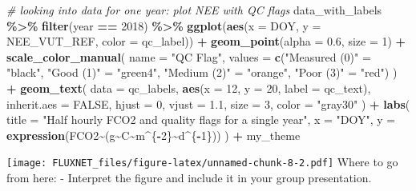 \documentclass[
]{article}
\newenvironment{Shaded}{\begin{snugshade}}{\end{snugshade}}
\newcommand{\AttributeTok}[1]{\textcolor[rgb]{0.13,0.29,0.53}{#1}}
\newcommand{\CommentTok}[1]{\textcolor[rgb]{0.56,0.35,0.01}{\textit{#1}}}
\newcommand{\ConstantTok}[1]{\textcolor[rgb]{0.56,0.35,0.01}{#1}}
\newcommand{\DecValTok}[1]{\textcolor[rgb]{0.00,0.00,0.81}{#1}}
\newcommand{\FloatTok}[1]{\textcolor[rgb]{0.00,0.00,0.81}{#1}}
\newcommand{\FunctionTok}[1]{\textcolor[rgb]{0.13,0.29,0.53}{\textbf{#1}}}
\newcommand{\NormalTok}[1]{#1}
\newcommand{\OtherTok}[1]{\textcolor[rgb]{0.56,0.35,0.01}{#1}}
\newcommand{\SpecialCharTok}[1]{\textcolor[rgb]{0.81,0.36,0.00}{\textbf{#1}}}
\newcommand{\StringTok}[1]{\textcolor[rgb]{0.31,0.60,0.02}{#1}}
\begin{document}
\begin{Shaded}
\begin{Highlighting}[]
\CommentTok{\# looking into data for one year: plot NEE with QC flags}
\NormalTok{data\_with\_labels }\SpecialCharTok{\%\textgreater{}\%}
  \FunctionTok{filter}\NormalTok{(year }\SpecialCharTok{==} \DecValTok{2018}\NormalTok{) }\SpecialCharTok{\%\textgreater{}\%} 
  \FunctionTok{ggplot}\NormalTok{(}\FunctionTok{aes}\NormalTok{(}\AttributeTok{x =}\NormalTok{ DOY, }\AttributeTok{y =}\NormalTok{ NEE\_VUT\_REF, }\AttributeTok{color =}\NormalTok{ qc\_label)) }\SpecialCharTok{+}
  \FunctionTok{geom\_point}\NormalTok{(}\AttributeTok{alpha =} \FloatTok{0.6}\NormalTok{, }\AttributeTok{size =} \DecValTok{1}\NormalTok{) }\SpecialCharTok{+}
  \FunctionTok{scale\_color\_manual}\NormalTok{(}
    \AttributeTok{name =} \StringTok{"QC Flag"}\NormalTok{,}
    \AttributeTok{values =} \FunctionTok{c}\NormalTok{(}\StringTok{"Measured (0)"} \OtherTok{=} \StringTok{"black"}\NormalTok{,}
               \StringTok{"Good (1)"} \OtherTok{=} \StringTok{"green4"}\NormalTok{,}
               \StringTok{"Medium (2)"} \OtherTok{=} \StringTok{"orange"}\NormalTok{,}
               \StringTok{"Poor (3)"} \OtherTok{=} \StringTok{"red"}\NormalTok{)}
\NormalTok{  ) }\SpecialCharTok{+}
  \FunctionTok{geom\_text}\NormalTok{(}
    \AttributeTok{data =}\NormalTok{ qc\_labels,}
    \FunctionTok{aes}\NormalTok{(}\AttributeTok{x =} \DecValTok{12}\NormalTok{, }\AttributeTok{y =} \DecValTok{20}\NormalTok{, }\AttributeTok{label =}\NormalTok{ qc\_text),}
    \AttributeTok{inherit.aes =} \ConstantTok{FALSE}\NormalTok{,}
    \AttributeTok{hjust =} \DecValTok{0}\NormalTok{,}
    \AttributeTok{vjust =} \FloatTok{1.1}\NormalTok{,}
    \AttributeTok{size =} \DecValTok{3}\NormalTok{,}
    \AttributeTok{color =} \StringTok{"gray30"}
\NormalTok{  ) }\SpecialCharTok{+}
  \FunctionTok{labs}\NormalTok{(}
    \AttributeTok{title =} \StringTok{"Half hourly FCO2 and quality flags for a single year"}\NormalTok{,}
    \AttributeTok{x =} \StringTok{"DOY"}\NormalTok{, }\AttributeTok{y =} \FunctionTok{expression}\NormalTok{(FCO2}\SpecialCharTok{\textasciitilde{}}\NormalTok{(g}\SpecialCharTok{\textasciitilde{}}\NormalTok{C}\SpecialCharTok{\textasciitilde{}}\NormalTok{m}\SpecialCharTok{\^{}}\NormalTok{\{}\SpecialCharTok{{-}}\DecValTok{2}\NormalTok{\}}\SpecialCharTok{\textasciitilde{}}\NormalTok{d}\SpecialCharTok{\^{}}\NormalTok{\{}\SpecialCharTok{{-}}\DecValTok{1}\NormalTok{\})) }
\NormalTok{  ) }\SpecialCharTok{+}\NormalTok{ my\_theme}
\end{Highlighting}
\end{Shaded}

\texttt{[image: FLUXNET\_files/figure-latex/unnamed-chunk-8-2.pdf]} Where
to go from here: - Interpret the figure and include it in your group
presentation.
\end{document}
